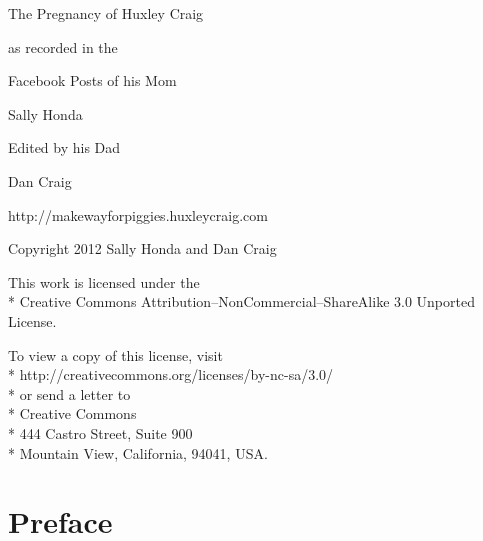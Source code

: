 \documentclass[11pt,ebook]{memoir}
\begin{document}
\frontmatter

\thispagestyle{empty}
\vspace*{1in}
\begin{center}
\end{center}

\cleardoublepage
\thispagestyle{empty}
\vspace*{\fill}
\begin{center}
\par
\vspace{1in}
\LARGE{The Pregnancy of Huxley Craig}\par
\vspace{0.25in}
\large{as recorded in the}\par
\large{Facebook Posts of his Mom}\par
\LARGE{Sally Honda}\par
\vspace{1in}
\large{Edited by his Dad}\par
\LARGE{Dan Craig}\par
\vspace{0.2in}
\large{http://makewayforpiggies.huxleycraig.com}
\end{center}
\vspace*{\fill}
\clearpage

\begingroup
\vspace*{\fill}
\footnotesize
\setlength{\parindent}{0pt}
\setlength{\parskip}{\baselineskip}
\textcopyright{} Copyright 2012 Sally Honda and Dan Craig

This work is licensed under the\\*
Creative Commons Attribution--NonCommercial--ShareAlike 3.0 Unported License.

To view a copy of this license, visit \\*
http://creativecommons.org/licenses/by-nc-sa/3.0/\\*
or send a letter to\\*
Creative Commons\\*
444 Castro Street, Suite 900\\*
Mountain View, California, 94041, USA.
\vspace*{\fill}
\endgroup
\clearpage

\tableofcontents
\thispagestyle{empty}
\cleardoublepage

\chapter{Preface}
\end{document}

